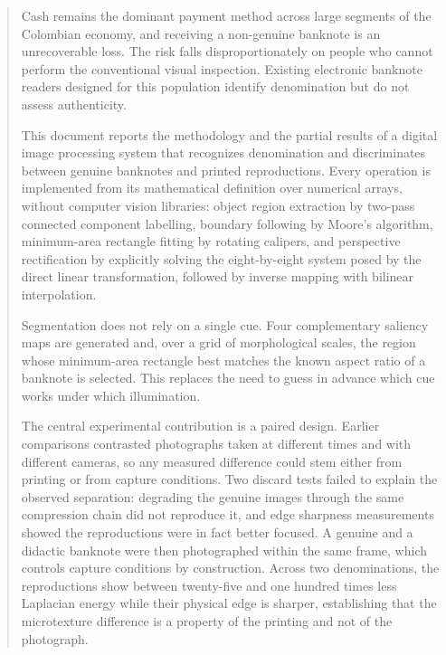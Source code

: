 \documentclass[conference]{IEEEtran}
\begin{document}
\renewcommand{\abstractname}{Abstract}
\begin{abstract}
Cash remains the dominant payment method across large segments of the
Colombian economy, and receiving a non-genuine banknote is an
unrecoverable loss. The risk falls disproportionately on people who
cannot perform the conventional visual inspection. Existing electronic
banknote readers designed for this population identify denomination but
do not assess authenticity.

This document reports the methodology and the partial results of a
digital image processing system that recognizes denomination and
discriminates between genuine banknotes and printed reproductions.
Every operation is implemented from its mathematical definition over
numerical arrays, without computer vision libraries: object region
extraction by two-pass connected component labelling, boundary
following by Moore's algorithm, minimum-area rectangle fitting by
rotating calipers, and perspective rectification by explicitly solving
the eight-by-eight system posed by the direct linear transformation,
followed by inverse mapping with bilinear interpolation.

Segmentation does not rely on a single cue. Four complementary saliency
maps are generated and, over a grid of morphological scales, the region
whose minimum-area rectangle best matches the known aspect ratio of a
banknote is selected. This replaces the need to guess in advance which
cue works under which illumination.

The central experimental contribution is a paired design. Earlier
comparisons contrasted photographs taken at different times and with
different cameras, so any measured difference could stem either from
printing or from capture conditions. Two discard tests failed to
explain the observed separation: degrading the genuine images through
the same compression chain did not reproduce it, and edge sharpness
measurements showed the reproductions were in fact better focused. A
genuine and a didactic banknote were then photographed within the same
frame, which controls capture conditions by construction. Across two
denominations, the reproductions show between twenty-five and one
hundred times less Laplacian energy while their physical edge is
sharper, establishing that the microtexture difference is a property of
the printing and not of the photograph.
\end{abstract}
\end{document}

